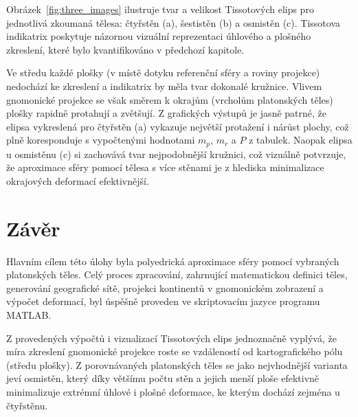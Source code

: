 Obrázek~\ref{fig:three_images} ilustruje tvar a velikost Tissotových elips pro jednotlivá zkoumaná tělesa: čtyřstěn (a), šestistěn (b) a osmistěn (c). Tissotova indikatrix poskytuje názornou vizuální reprezentaci úhlového a plošného zkreslení, které bylo kvantifikováno v předchozí kapitole.

Ve středu každé plošky (v místě dotyku referenční sféry a roviny projekce) nedochází ke zkreslení a indikatrix by měla tvar dokonalé kružnice. Vlivem gnomonické projekce se však směrem k okrajům (vrcholům platonských těles) plošky rapidně protahují a zvětšují. Z grafických výstupů je jasně patrné, že elipsa vykreslená pro čtyřstěn (a) vykazuje největší protažení i nárůst plochy, což plně koresponduje s vypočtenými hodnotami $m_p$, $m_r$ a $P$ z tabulek. Naopak elipsa u osmistěnu (c) si zachovává tvar nejpodobnější kružnici, což vizuálně potvrzuje, že aproximace sféry pomocí tělesa s více stěnami je z hlediska minimalizace okrajových deformací efektivnější.


\section{Závěr}
Hlavním cílem této úlohy byla polyedrická aproximace sféry pomocí vybraných platonských těles. Celý proces zpracování, zahrnující matematickou definici těles, generování geografické sítě, projekci kontinentů v gnomonickém zobrazení a výpočet deformací, byl úspěšně proveden ve skriptovacím jazyce programu MATLAB.

Z provedených výpočtů i vizualizací Tissotových elips jednoznačně vyplývá, že míra zkreslení gnomonické projekce roste se vzdáleností od kartografického pólu (středu plošky). Z porovnávaných platonských těles se jako nejvhodnější varianta jeví osmistěn, který díky většímu počtu stěn a jejich menší ploše efektivně minimalizuje extrémní úhlové i plošné deformace, ke kterým dochází zejména u čtyřstěnu.